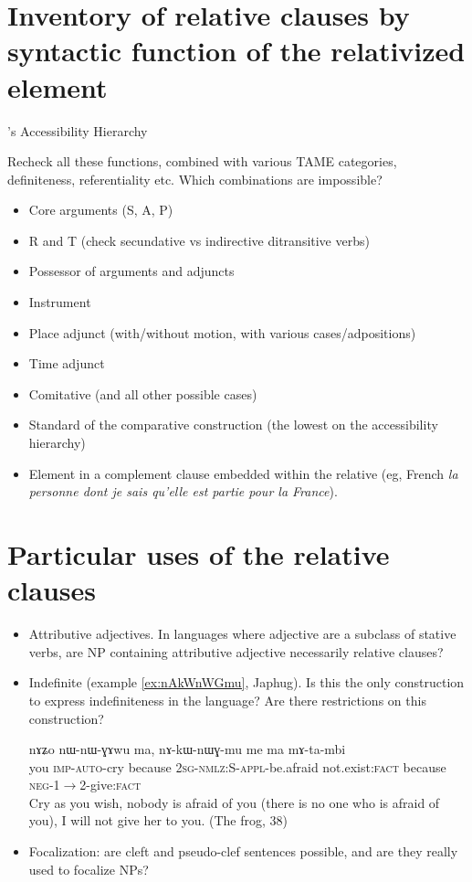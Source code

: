 \documentclass[oldfontcommands,oneside,a4paper,11pt]{article}
\newcommand{\ipa}[1]{{\phon #1}} %
\begin{document}
 \section{Inventory of relative clauses by syntactic function of the relativized element} \label{sec:inventory}
\citet{keenan77accessibility}'s Accessibility Hierarchy

Recheck all these functions, combined with various TAME categories, definiteness, referentiality etc. Which combinations are impossible?

\begin{itemize}
\item Core arguments (S, A, P)
\item R and T (check secundative vs indirective ditransitive verbs)
\item Possessor of arguments and adjuncts
\item Instrument
\item Place adjunct (with/without motion, with various cases/adpositions)
\item Time adjunct
\item Comitative (and all other possible cases)
\item Standard of the comparative construction (the lowest on the accessibility hierarchy)
\item Element in a complement clause embedded within the relative (eg, French \textit{la personne dont je sais qu'elle est partie pour la France}).

\end{itemize}


\section{Particular uses of the relative clauses}
\begin{itemize}
\item Attributive adjectives. In languages where adjective are a subclass of stative verbs, are NP containing attributive adjective necessarily relative clauses?
\item Indefinite (example \ref{ex:nAkWnWGmu}, Japhug). Is this the only construction to express indefiniteness in the language? Are there restrictions on this construction?

\begin{exe}
   \ex  \label{ex:nAkWnWGmu}
\gll   
\ipa{nɤʑo}  	\ipa{nɯ-nɯ-ɣɤwu}  	\ipa{ma,}  	\ipa{nɤ-kɯ-nɯɣ-mu}  	\ipa{me}  	\ipa{ma}  	\ipa{mɤ-ta-mbi}  \\
you \textsc{imp-auto}-cry because \textsc{2sg-nmlz:S-appl}-be.afraid not.exist:\textsc{fact} because \textsc{neg-1$\rightarrow$2-}give:\textsc{fact} \\
\glt Cry as you wish, nobody is afraid of you (there is no one who is afraid of you), I will not give her to you.  (The frog, 38)
\end{exe}
\item Focalization: are cleft and  pseudo-clef sentences possible, and are they really used to focalize NPs?
\end{itemize}
\end{document}
